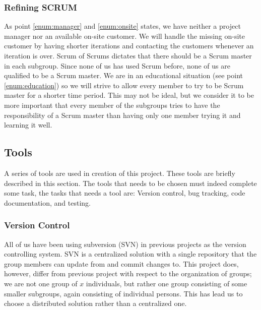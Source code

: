 \subsubsection{Refining SCRUM} 
As point \ref{enum:manager} and \ref{enum:onsite} states, we have neither a project manager nor an available on-site customer.
We will handle the missing on-site customer by having shorter iterations and contacting the customers whenever an iteration is over.
Scrum of Scrums\cite{scrumOfScrums} dictates that there should be a Scrum master in each subgroup.
Since none of us has used Scrum before, none of us are qualified to be a Scrum master.
We are in an educational situation (see point \ref{enum:education}) so we will strive to allow every member to try to be Scrum master for a shorter time period.
This may not be ideal, but we consider it to be more important that every member of the subgroups tries to have the responsibility of a Scrum master than having only one member trying it and learning it well.

\begin{comment}
There is more:
*Scrum board
*The phases / meetings
**estimation
**sprint planning
*Scrum meetings
*Scrum of scrum def
*project manager problem
\end{comment}


\subsection{Tools}
A series of tools are used in creation of this project.
These tools are briefly described in this section.
The tools that needs to be chosen must indeed complete some task, the tasks that needs a tool are: Version control, bug tracking, code documentation, and testing.

\subsubsection{Version Control}
All of us have been using subversion (SVN) in previous projects as the version controlling system.
SVN is a centralized solution \cite{subversion} with a single repository that the group members can update from and commit changes to.
This project does, however, differ from previous project with respect to the organization of groups; we are not one group of $x$ individuals, but rather one group consisting of some smaller subgroups, again consisting of individual persons.
This has lead us to choose a distributed solution rather than a centralized one.

